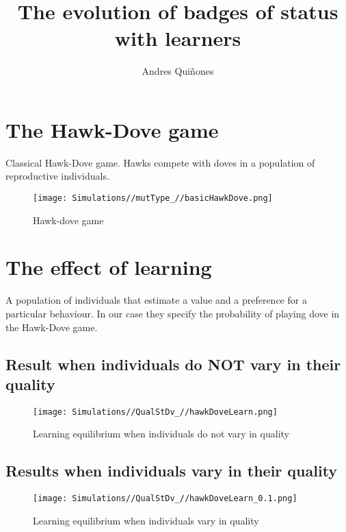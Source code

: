 \documentclass[]{article}
\title{The evolution of badges of status with learners}
\author{Andres Quiñones}
\date{}
\begin{document}
\maketitle

\hypertarget{the-hawk-dove-game}{%
\section{The Hawk-Dove game}\label{the-hawk-dove-game}}

Classical Hawk-Dove game. Hawks compete with doves in a population of
reproductive individuals.

\begin{figure}
\centering
\texttt{[image: Simulations//mutType\_//basicHawkDove.png]}
\caption{Hawk-dove game}
\end{figure}

\hypertarget{the-effect-of-learning}{%
\section{The effect of learning}\label{the-effect-of-learning}}

A population of individuals that estimate a value and a preference for a
particular behaviour. In our case they specify the probability of
playing dove in the Hawk-Dove game.

\hypertarget{result-when-individuals-do-not-vary-in-their-quality}{%
\subsection{Result when individuals do NOT vary in their
quality}\label{result-when-individuals-do-not-vary-in-their-quality}}

\begin{figure}
\centering
\texttt{[image: Simulations//QualStDv\_//hawkDoveLearn.png]}
\caption{Learning equilibrium when individuals do not vary in quality}
\end{figure}

\hypertarget{results-when-individuals-vary-in-their-quality}{%
\subsection{Results when individuals vary in their
quality}\label{results-when-individuals-vary-in-their-quality}}

\begin{figure}
\centering
\texttt{[image: Simulations//QualStDv\_//hawkDoveLearn\_0.1.png]}
\caption{Learning equilibrium when individuals vary in quality}
\end{figure}
\end{document}
